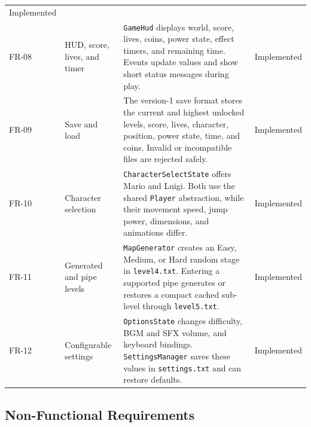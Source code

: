\documentclass{template}
\begin{document}
\begin{longtable}{@{}p{1.1cm}p{3.2cm}p{7.3cm}p{2.4cm}@{}}
    Implemented \\
    FR-08 & HUD, score, lives, and timer & \texttt{GameHud} displays world,
    score, lives, coins, power state, effect timers, and remaining time. Events
    update values and show short status messages during play. & Implemented \\
    FR-09 & Save and load & The version-1 save format stores the current and
    highest unlocked levels, score, lives, character, position, power state,
    time, and coins. Invalid or incompatible files are rejected safely. &
    Implemented \\
    FR-10 & Character selection & \texttt{CharacterSelectState} offers Mario
    and Luigi. Both use the shared \texttt{Player} abstraction, while their
    movement speed, jump power, dimensions, and animations differ. &
    Implemented \\
    FR-11 & Generated and pipe levels & \texttt{MapGenerator} creates an Easy,
    Medium, or Hard random stage in \texttt{level4.txt}. Entering a supported
    pipe generates or restores a compact cached sub-level through
    \texttt{level5.txt}. & Implemented \\
    FR-12 & Configurable settings & \texttt{OptionsState} changes difficulty,
    BGM and SFX volume, and keyboard bindings. \texttt{SettingsManager} saves
    these values in \texttt{settings.txt} and can restore defaults. &
    Implemented \\
    \bottomrule
\end{longtable}

\subsection{Non-Functional Requirements}
\end{document}

